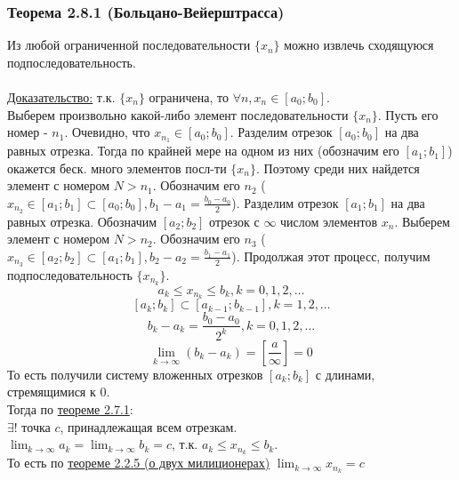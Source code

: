 \documentclass[12pt]{article}
\begin{document}
    \subsubsection*{Теорема 2.8.1 (Больцано-Вейерштрасса)}\label{th:2.8.1}
    \indent Из любой ограниченной последовательности $\{x_n\}$ можно извлечь сходящуюся подпоследовательность.\\\\
    \underline{Доказательство:} т.к. $\{x_n\}$ ограничена, то $\forall n, x_n \in [a_{0}; b_{0}]$.\\
    Выберем произвольно какой-либо элемент последовательности $\{x_n\}$. Пусть его номер - $n_{1}$. Очевидно, что $x_{n_{1}} \in [a_{0}; b_{0}]$. Разделим отрезок $[a_{0}; b_{0}]$ на два равных отрезка. Тогда по крайней мере на одном из них (обозначим его $[a_{1}; b_{1}]$) окажется беск. много элементов посл-ти $\{x_n\}$. Поэтому среди них найдется элемент с номером $N > n_{1}$. Обозначим его $n_{2}$ ($x_{n_{2}} \in [a_{1}; b_{1}] \subset [a_{0}; b_{0}], b_{1} - a_{1} = \frac{b_{0} - a_{0}}{2}$). Разделим отрезок $[a_{1}; b_{1}]$ на два равных отрезка. Обозначим $[a_{2}; b_{2}]$ отрезок с $\infty$ числом элементов $x_n$. Выберем элемент с номером $N > n_{2}$. Обозначим его $n_{3}$ ($x_{n_{3}} \in [a_{2}; b_{2}] \subset [a_{1}; b_{1}], b_{2} - a_{2} = \frac{b_{1} - a_{1}}{2}$). Продолжая этот процесс, получим подпоследовательность $\{x_{n_{k}}\}$.\\
    \[a_{k} \le x_{n_{k}} \le b_{k}, k = 0, 1, 2, \dots\]
    \[[a_{k}; b_{k}] \subset [a_{k-1}; b_{k-1}], k = 1, 2, \dots\]
    \[b_{k} - a_{k} = \frac{b_{0} - a_{0}}{2^{k}}, k = 0,1,2,\dots\]
    \[\lim_{k\to\infty}(b_{k}-a_{k}) = [\frac{a}{\infty}] = 0\]
    То есть получили систему вложенных отрезков $[a_{k}; b_{k}]$ с длинами, стремящимися к $0$.\\
    Тогда по \hyperref[th:2.7.1]{теореме 2.7.1}:\\
    \indent $\exists !$ точка $c$, принадлежащая всем отрезкам.\\
    \indent $\lim_{k\to\infty}a_{k} = \lim_{k\to\infty}b_{k} = c$, т.к. $a_{k} \le x_{n_{k}} \le b_{k}$.\\
    \indent То есть по \hyperref[th:2.2.5]{теореме 2.2.5 (о двух милиционерах)} $\lim_{k\to\infty}x_{n_{k}} = c$\\
\end{document}
